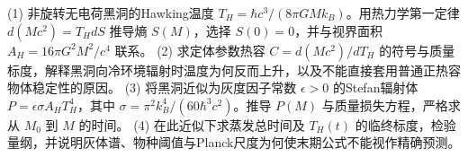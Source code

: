 (1) 非旋转无电荷黑洞的Hawking温度 \(T_H=\hbar c^3/(8\pi GMk_B)\)。用热力学第一定律 \(d(Mc^2)=T_HdS\) 推导熵 \(S(M)\)，选择 \(S(0)=0\)，并与视界面积 \(A_H=16\pi G^2M^2/c^4\) 联系。
(2) 求定体参数热容 \(C=d(Mc^2)/dT_H\) 的符号与质量标度，解释黑洞向冷环境辐射时温度为何反而上升，以及不能直接套用普通正热容物体稳定性的原因。
(3) 将黑洞近似为灰度因子常数 \(\epsilon>0\) 的Stefan辐射体 \(P=\epsilon\sigma A_HT_H^4\)，其中 \(\sigma=\pi^2k_B^4/(60\hbar^3c^2)\)。推导 \(P(M)\) 与质量损失方程，严格求从 \(M_0\) 到 \(M\) 的时间。
(4) 在此近似下求蒸发总时间及 \(T_H(t)\) 的临终标度，检验量纲，并说明灰体谱、物种阈值与Planck尺度为何使末期公式不能视作精确预测。
